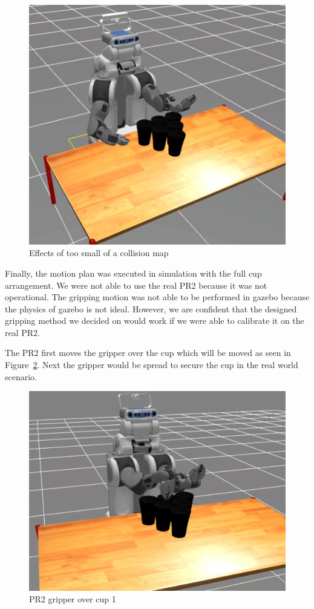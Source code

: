 \documentclass[letterpaper, 10 pt, conference]{ieeeconf}  %
\begin{document}
\begin{figure}[thpb]
      \centering
	  \includegraphics[scale =0.3]{dumb}
      \caption{Effects of too small of a collision map}
      \label{fig:dumb}
\end{figure}

Finally, the motion plan was executed in simulation with the full cup arrangement. We were not able to use the real PR2 because it was not operational. The gripping motion was not able to be performed in gazebo because the physics of gazebo is not ideal. However, we are confident that the designed gripping method we decided on would work if we were able to calibrate it on the real PR2. 

The PR2 first moves the gripper over the cup which will be moved as seen in Figure~\ref{fig:over}. Next the gripper would be spread to secure the cup in the real world scenario.
\begin{figure}[thpb]
      \centering
	  \includegraphics[scale =0.3]{gripper_over_cup}
      \caption{PR2 gripper over cup 1}
      \label{fig:over}
\end{figure}
\end{document}
